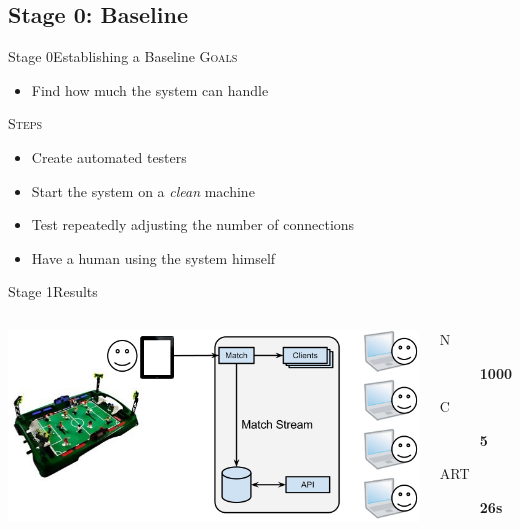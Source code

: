 \documentclass[utf8]{beamer}
\begin{document}
\subsection{Stage 0: Baseline}
\begin{frame}{Stage 0}{Establishing a Baseline}
	\textsc{Goals}
	\begin{itemize}
		\item Find how much the system can handle
	\end{itemize}
	\pause
	\textsc{Steps}
	\begin{itemize}
		\item Create automated testers
		\item Start the system on a \emph{clean} machine
		\item Test repeatedly adjusting the number of connections
		\item Have a human using the system himself
	\end{itemize}
\end{frame}
\begin{frame}{Stage 1}{Results}
	\begin{columns}
			\includegraphics[top=-1,width=\textwidth]{img/results-1.png}
			\begin{description}
				\item[N] \textbf{\Large 1000}
				\item[C] \textbf{\Large 5}
				\item[ART] \textbf{\Large 26s}
			\end{description}
	\end{columns}
\end{frame}
\end{document}
